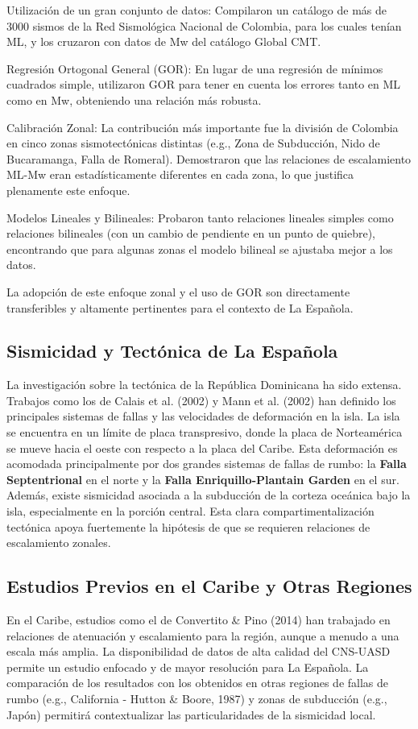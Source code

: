 \documentclass[12pt,a4paper]{article}
\begin{document}
Utilización de un gran conjunto de datos: Compilaron un catálogo de más de 3000 sismos de la Red Sismológica Nacional de Colombia, para los cuales tenían ML, y los cruzaron con datos de Mw del catálogo Global CMT.

Regresión Ortogonal General (GOR): En lugar de una regresión de mínimos cuadrados simple, utilizaron GOR para tener en cuenta los errores tanto en ML como en Mw, obteniendo una relación más robusta.

Calibración Zonal: La contribución más importante fue la división de Colombia en cinco zonas sismotectónicas distintas (e.g., Zona de Subducción, Nido de Bucaramanga, Falla de Romeral). Demostraron que las relaciones de escalamiento ML-Mw eran estadísticamente diferentes en cada zona, lo que justifica plenamente este enfoque.

Modelos Lineales y Bilineales: Probaron tanto relaciones lineales simples como relaciones bilineales (con un cambio de pendiente en un punto de quiebre), encontrando que para algunas zonas el modelo bilineal se ajustaba mejor a los datos.

La adopción de este enfoque zonal y el uso de GOR son directamente transferibles y altamente pertinentes para el contexto de La Española.

\subsection{Sismicidad y Tectónica de La Española}
La investigación sobre la tectónica de la República Dominicana ha sido extensa. Trabajos como los de Calais et al. (2002) y Mann et al. (2002) han definido los principales sistemas de fallas y las velocidades de deformación en la isla. La isla se encuentra en un límite de placa transpresivo, donde la placa de Norteamérica se mueve hacia el oeste con respecto a la placa del Caribe. Esta deformación es acomodada principalmente por dos grandes sistemas de fallas de rumbo: la \textbf{Falla Septentrional} en el norte y la \textbf{Falla Enriquillo-Plantain Garden} en el sur. Además, existe sismicidad asociada a la subducción de la corteza oceánica bajo la isla, especialmente en la porción central. Esta clara compartimentalización tectónica apoya fuertemente la hipótesis de que se requieren relaciones de escalamiento zonales.

\subsection{Estudios Previos en el Caribe y Otras Regiones}
En el Caribe, estudios como el de Convertito \& Pino (2014) han trabajado en relaciones de atenuación y escalamiento para la región, aunque a menudo a una escala más amplia. La disponibilidad de datos de alta calidad del CNS-UASD permite un estudio enfocado y de mayor resolución para La Española. La comparación de los resultados con los obtenidos en otras regiones de fallas de rumbo (e.g., California - Hutton \& Boore, 1987) y zonas de subducción (e.g., Japón) permitirá contextualizar las particularidades de la sismicidad local.
\end{document}
